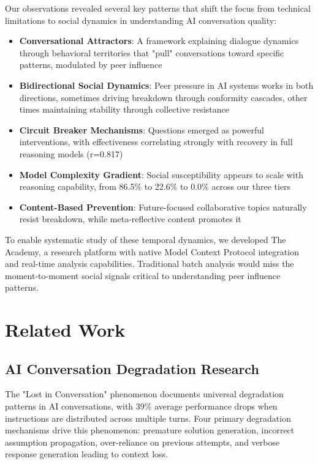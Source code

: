 \documentclass[11pt,letterpaper]{article}
\newcommand{\theacademy}{The Academy}
\newcommand{\exponedataPeerPressurePercentage}{86.5\%}
\newcommand{\exponedataQuestionCorrelation}{0.817}
\newcommand{\exptwoPeerPressurePercentage}{22.6\%}
\newcommand{\expthreePeerPressurePercentage}{0.0\%}
\begin{document}
Our observations revealed several key patterns that shift the focus from technical limitations to social dynamics in understanding AI conversation quality:
\begin{itemize}
    \item \textbf{Conversational Attractors}: A framework explaining dialogue dynamics through behavioral territories that "pull" conversations toward specific patterns, modulated by peer influence
    \item \textbf{Bidirectional Social Dynamics}: Peer pressure in AI systems works in both directions, sometimes driving breakdown through conformity cascades, other times maintaining stability through collective resistance
    \item \textbf{Circuit Breaker Mechanisms}: Questions emerged as powerful interventions, with effectiveness correlating strongly with recovery in full reasoning models (r=\exponedataQuestionCorrelation{})
    \item \textbf{Model Complexity Gradient}: Social susceptibility appears to scale with reasoning capability, from \exponedataPeerPressurePercentage{} to \exptwoPeerPressurePercentage{} to \expthreePeerPressurePercentage{} across our three tiers
    \item \textbf{Content-Based Prevention}: Future-focused collaborative topics naturally resist breakdown, while meta-reflective content promotes it
\end{itemize}

To enable systematic study of these temporal dynamics, we developed \theacademy{}, a research platform with native Model Context Protocol integration and real-time analysis capabilities. Traditional batch analysis would miss the moment-to-moment social signals critical to understanding peer influence patterns.

\section{Related Work}

\subsection{AI Conversation Degradation Research}

The "Lost in Conversation" phenomenon \citep{laban2025lost} documents universal degradation patterns in AI conversations, with 39\% average performance drops when instructions are distributed across multiple turns. Four primary degradation mechanisms drive this phenomenon: premature solution generation, incorrect assumption propagation, over-reliance on previous attempts, and verbose response generation leading to context loss.
\end{document}
